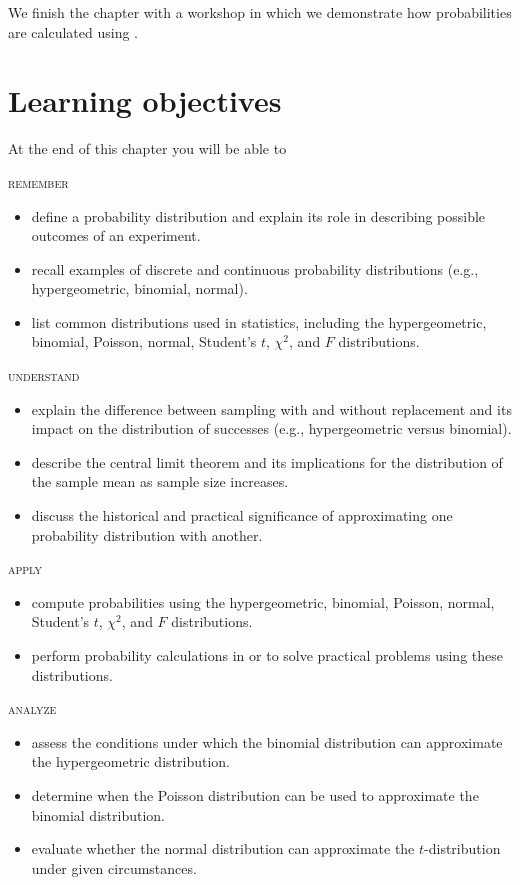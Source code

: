 We finish the chapter with a workshop in which we demonstrate how probabilities are calculated using .

\section*{Learning objectives}
At the end of this chapter you will be able to

\bigskip
\noindent \textsc{remember}

\begin{itemize}
\item define a probability distribution and explain its role in describing possible outcomes of an experiment.
\item recall examples of discrete and continuous probability distributions (e.g., hypergeometric, binomial, normal).
\item list common distributions used in statistics, including the hypergeometric, binomial, Poisson, normal, Student’s $t$, $\chi^2$, and $F$ distributions.
\end{itemize}

\noindent \textsc{understand}
\begin{itemize}

\item explain the difference between sampling with and without replacement and its impact on the distribution of successes (e.g., hypergeometric versus binomial).
\item describe the central limit theorem and its implications for the distribution of the sample mean as sample size increases.
\item discuss the historical and practical significance of approximating one probability distribution with another.
\end{itemize}

\noindent \textsc{apply}
\begin{itemize}


\item compute probabilities using the hypergeometric, binomial, Poisson, normal, Student’s $t$, $\chi^2$, and $F$ distributions.
\item perform probability calculations in  or  to solve practical problems using these distributions.
\end{itemize}

\noindent \textsc{analyze}
\begin{itemize}


\item assess the conditions under which the binomial distribution can approximate the hypergeometric distribution.
\item determine when the Poisson distribution can be used to approximate the binomial distribution.
\item evaluate whether the normal distribution can approximate the $t$-distribution under given circumstances.
\end{itemize}

